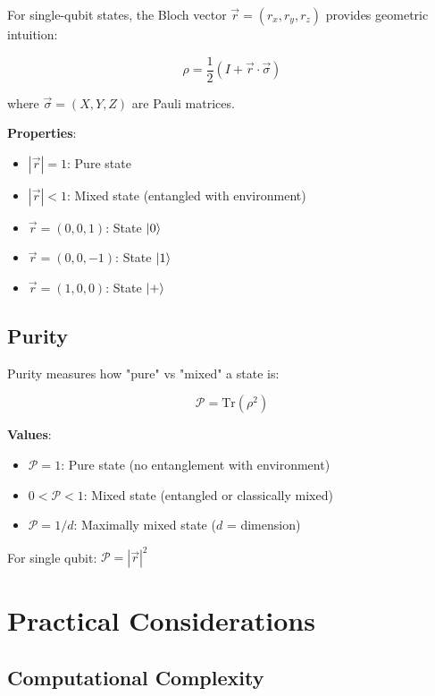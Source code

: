 \documentclass[11pt,a4paper]{article}
\begin{document}
For single-qubit states, the Bloch vector $\vec{r} = (r_x, r_y, r_z)$ provides geometric intuition:

\begin{equation}
    \rho = \frac{1}{2}(I + \vec{r} \cdot \vec{\sigma})
\end{equation}

where $\vec{\sigma} = (X, Y, Z)$ are Pauli matrices.

\textbf{Properties}:
\begin{itemize}
    \item $|\vec{r}| = 1$: Pure state
    \item $|\vec{r}| < 1$: Mixed state (entangled with environment)
    \item $\vec{r} = (0, 0, 1)$: State $\ket{0}$
    \item $\vec{r} = (0, 0, -1)$: State $\ket{1}$
    \item $\vec{r} = (1, 0, 0)$: State $\ket{+}$
\end{itemize}

\subsection{Purity}

Purity measures how "pure" vs "mixed" a state is:

\begin{equation}
    \mathcal{P} = \text{Tr}(\rho^2)
\end{equation}

\textbf{Values}:
\begin{itemize}
    \item $\mathcal{P} = 1$: Pure state (no entanglement with environment)
    \item $0 < \mathcal{P} < 1$: Mixed state (entangled or classically mixed)
    \item $\mathcal{P} = 1/d$: Maximally mixed state ($d$ = dimension)
\end{itemize}

For single qubit: $\mathcal{P} = |\vec{r}|^2$

\section{Practical Considerations}

\subsection{Computational Complexity}
\end{document}
